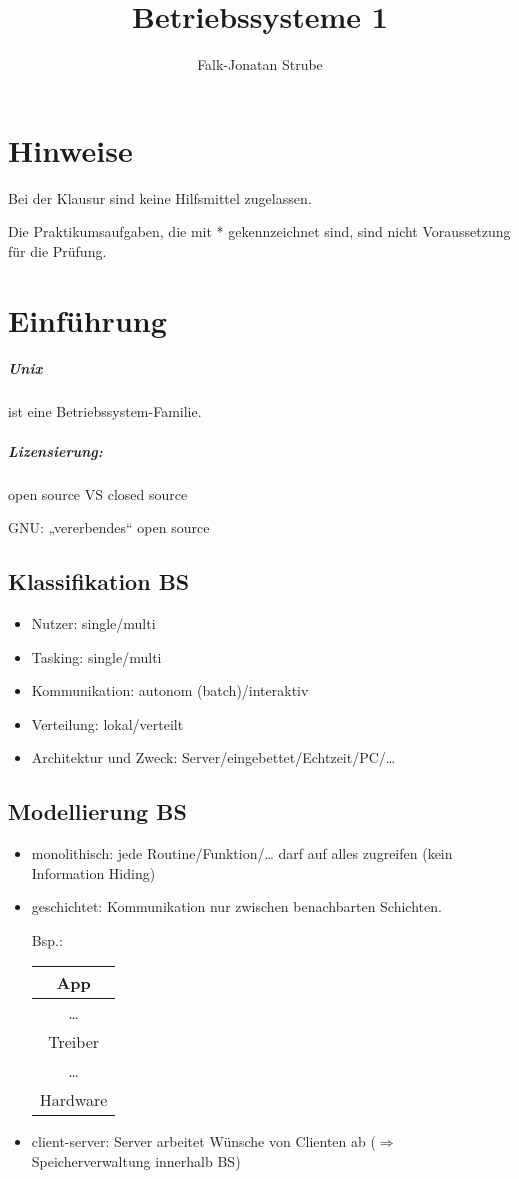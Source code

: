 \documentclass{scrreprt}
\title{Betriebssysteme 1}
\author{Falk-Jonatan Strube}
\renewcommand{\imptnt}[1]{#1}
\begin{document}
\maketitle
\tableofcontents

\chapter*{Hinweise}
Bei der Klausur sind keine Hilfsmittel zugelassen.

Die Praktikumsaufgaben, die mit * gekennzeichnet sind, sind nicht Voraussetzung für die Prüfung.

\chapter{Einführung}

\paragraph{Unix} ist eine Betriebssystem-Familie.

\paragraph{Lizensierung:} open source VS closed source

GNU: „vererbendes“ open source
\section{Klassifikation BS}
\begin{itemize}
\item Nutzer: single/multi
\item Tasking: single/multi
\item Kommunikation: autonom (batch)/interaktiv
\item Verteilung: lokal/verteilt
\item Architektur und Zweck: Server/eingebettet/Echtzeit/PC/…
\end{itemize}

\section{Modellierung BS}
\begin{itemize}
\item \imptnt{monolithisch:} jede Routine/Funktion/… darf auf alles zugreifen (kein Information Hiding)
\item \imptnt{geschichtet:} Kommunikation nur zwischen benachbarten Schichten.

Bsp.: \begin{tabular}{|c|}
\hline
App\\
\hline
…\\
\hline
Treiber\\
\hline
…\\
\hline
Hardware\\
\hline
\end{tabular}
\item \imptnt{client-server:} Server arbeitet Wünsche von Clienten ab ($\Rightarrow$ Speicherverwaltung innerhalb BS)
\end{itemize}
\end{document}
